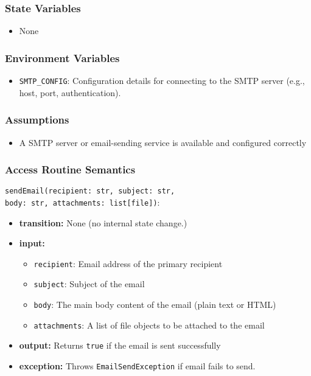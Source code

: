 \documentclass[12pt, titlepage]{article}
\begin{document}
\begin{itemize}
\subsubsection{State Variables}

\begin{itemize}
    \item None
\end{itemize}

\subsubsection{Environment Variables}

\begin{itemize}
    \item \texttt{SMTP\_CONFIG}: Configuration details for connecting to the SMTP server (e.g., host, port, authentication).
\end{itemize}

\subsubsection{Assumptions}

\begin{itemize}
    \item A SMTP server or email-sending service is available and configured correctly
\end{itemize}

\subsubsection{Access Routine Semantics}

\noindent \texttt{sendEmail(recipient: str, subject: str, \\
    body: str, attachments: list[file])}:
\begin{itemize}
    \item \textbf{transition:} None (no internal state change.)
    \item \textbf{input:} 
    \begin{itemize}
        \item \texttt{recipient}: Email address of the primary recipient
        \item \texttt{subject}: Subject of the email
        \item \texttt{body}: The main body content of the email (plain text or HTML)
        \item \texttt{attachments}: A list of file objects to be attached to the email
    \end{itemize}
    \item \textbf{output:} Returns \texttt{true} if the email is sent successfully
    \item \textbf{exception:} Throws \texttt{EmailSendException} if email fails to send.
\end{itemize}



\end{itemize}
\end{document}
